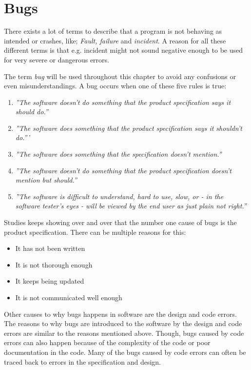 \section{Bugs}\label{sec:Bug}
There exists a lot of terms to describe that a program is not behaving as intended or crashes, like; \textit{Fault, failure} and \textit{incident}.
A reason for all these different terms is that e.g. incident might not sound negative enough to be used for very severe or dangerous errors. \cite{SoftwareTesting}

The term \textit{bug} will be used throughout this chapter to avoid any confusions or even misunderstandings.
A bug occurs when one of these five rules is true: \cite{SoftwareTesting} %

\begin{enumerate}
	\item \textit{''The software doesn't do something that the product specification says it should do.''}
	\item \textit{''The software does something that the product specification says it shouldn't do.'''}
	\item \textit{''The software does something that the specification doesn't mention.''}
	\item \textit{''The software doesn't do something that the product specification doesn't mention but should.''}
	\item \textit{''The software is difficult to understand, hard to use, slow, or - in the software tester's eyes - will be viewed by the end user as just plain not right.''}
\end{enumerate}

Studies keeps showing over and over that the number one cause of bugs is the product specification.
There can be multiple reasons for this: \cite{SoftwareTesting}

\begin{itemize}
	\item It has not been written
	\item It is not thorough enough
	\item It keeps being updated
	\item It is not communicated well enough
\end{itemize}

Other causes to why bugs happens in software are the design and code errors.
The reasons to why bugs are introduced to the software by the design and code errors are similar to the reasons mentioned above.
Though, bugs caused by code errors can also happen because of the complexity of the code or poor documentation in the code.
Many of the bugs caused by code errors can often be traced back to errors in the specification and design. \cite{SoftwareTesting}

